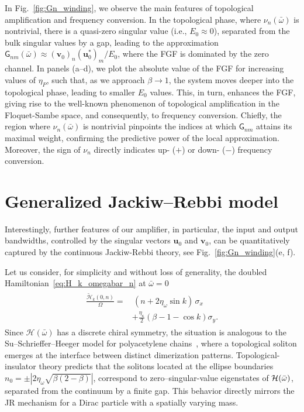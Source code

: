 \documentclass[a4paper,twocolumn,floatfix,10pt,superscriptaddress]%
{quantumarticle}
\newcommand{\msf}[1]{\mathsf{#1}}
\newcommand{\mcl}[1]{\mathcal{#1}}
\newcommand{\bsb}[1]{\boldsymbol{#1}}
\newcommand{\bomega}{{\bar{\omega}}}
\newcommand{\mcH}{{\mcl{H}}}
\newcommand{\msG}{{\msf{G}}}
\newcommand{\bu}{{\bsb{u}}}
\newcommand{\bv}{{\bsb{v}}}
\begin{document}
In Fig.~\ref{fig:Gn_winding}, we observe the main features of topological amplification and frequency conversion. In the topological phase, where $\nu_n(\bar\omega)$ is nontrivial, there is a quasi-zero singular value (i.e., $E_0\approx0$), separated from the bulk singular values by a gap, leading to the approximation $\msG_{nm}(\bar\omega)\approx (\bsb{v}_0)_n (\bsb{u}_0^*)_m/E_0$, where the FGF is dominated by the zero channel. In panels (a–d), we plot the absolute value of the FGF for increasing values of $\eta_P$, such that, as we approach $\beta\rightarrow 1$, the system moves deeper into the topological phase, leading to smaller $E_0$ values. This, in turn, enhances the FGF, giving rise to the well-known phenomenon of topological amplification in the Floquet-Sambe space, and consequently, to frequency conversion. Chiefly, the region where $\nu_n(\bar\omega)$ is nontrivial pinpoints the indices at which $\msG_{nm}$ attains its maximal weight, confirming the predictive power of the local approximation. Moreover, the sign of $\nu_n$ directly indicates up- ($+$) or down- ($-$) frequency conversion.
\section{Generalized Jackiw--Rebbi model}\label{sec::4}
Interestingly, further features of our amplifier, in particular, the input and output bandwidths, controlled by the singular vectors $\bu_0$ and $\bv_0$, can be quantitatively captured by the continuous Jackiw-Rebbi theory, see Fig.~\ref{fig:Gn_winding}(e, f). 

Let us consider, for simplicity and without loss of generality, the doubled Hamiltonian~\eqref{eq:H_k_omegabar_n} at $\bomega=0$ 
\begin{align}
\begin{aligned}
\frac{\tilde{\mcH}_k(0,n)}{\Omega}=&\,(n+2\eta_\omega\sin k)\,\sigma_x
\\
&+\frac{\eta_\kappa}{2}\left(\beta-1-\cos k\right)\sigma_y.    
\end{aligned}
\label{eq:H_cal_omega_bar_0}
\end{align}
Since $\mcH(\bar{\omega})$ has a discrete chiral symmetry, the situation is analogous to the Su–Schrieffer–Heeger model for polyacetylene chains~\cite{Heeger88rmp}, where a topological soliton emerges at the interface between distinct dimerization patterns. Topological-insulator theory predicts that the solitons located at the ellipse boundaries $n_0=\pm|2\eta_\omega\sqrt{\beta(2-\beta)}|$, correspond to zero–singular-value eigenstates of ${\cal H}(\bar{\omega})$, separated from the continuum by a finite gap. This behavior directly mirrors the JR mechanism for a Dirac particle with a spatially varying mass. 
\end{document}
